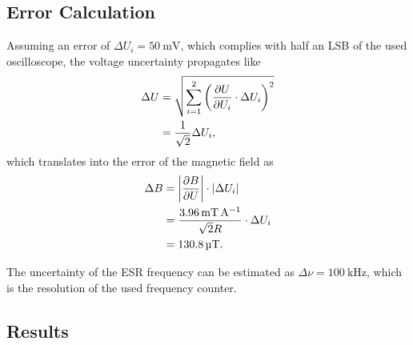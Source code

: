 \subsection{Error Calculation}
Assuming an error of $\Delta U_i=\SI{50}{\mV}$, which complies with half an LSB  of the used oscilloscope, the voltage uncertainty propagates like
\begin{alignat*}{2}
	\Delta U &= \sqrt{\sum^2_{i=1}\left(\frac{\partial U}{\partial U_i}\cdot \Delta U_i\right)^2} \\
	&=\frac{1}{\sqrt{2}}\Delta U_i,
\end{alignat*}
which translates into the error of the magnetic field as
\begin{alignat*}{2}
	\Delta B &= \left| \frac{\partial B}{\partial U} \right|\cdot \left| \Delta U_i \right| \\
	&= \frac{\SI{3.96}{\milli\tesla\per\ampere}}{\sqrt{2}R}\cdot\Delta U_i \\
	&= \SI{130.8}{\micro\tesla}.
\end{alignat*}

The uncertainty of the ESR frequency can be estimated as $\Delta\nu = \SI{100}{\kHz}$, which is the resolution of the used frequency counter.

\subsection{Results}
